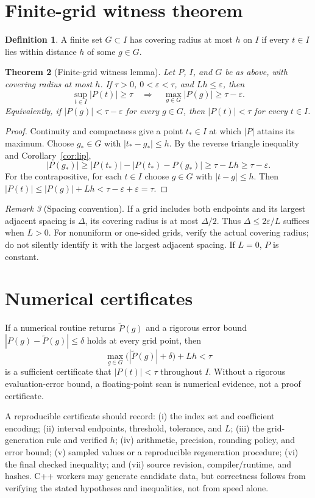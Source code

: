 \documentclass[11pt]{article}
\newtheorem{theorem}{Theorem}[section]
\theoremstyle{definition}\newtheorem{definition}[theorem]{Definition}
\theoremstyle{remark}\newtheorem{remark}[theorem]{Remark}
\begin{document}
\section{Finite-grid witness theorem}
\begin{definition}
A finite set $G\subset I$ has covering radius at most $h$ on $I$ if every $t\in I$ lies within distance $h$ of some $g\in G$.
\end{definition}
\begin{theorem}[Finite-grid witness lemma]\label{thm:grid}
Let $P$, $I$, and $G$ be as above, with covering radius at most $h$. If $\tau>0$, $0<\varepsilon<\tau$, and $Lh\le\varepsilon$, then
\[
\sup_{t\in I}|P(t)|\ge\tau
\quad\Longrightarrow\quad
\max_{g\in G}|P(g)|\ge\tau-\varepsilon.
\]
Equivalently, if $|P(g)|<\tau-\varepsilon$ for every $g\in G$, then $|P(t)|<\tau$ for every $t\in I$.
\end{theorem}
\begin{proof}
Continuity and compactness give a point $t_*\in I$ at which $|P|$ attains its maximum. Choose $g_*\in G$ with $|t_*-g_*|\le h$. By the reverse triangle inequality and Corollary~\ref{cor:lip},
\[
|P(g_*)|\ge |P(t_*)|-|P(t_*)-P(g_*)|
\ge\tau-Lh\ge\tau-\varepsilon.
\]
For the contrapositive, for each $t\in I$ choose $g\in G$ with $|t-g|\le h$. Then $|P(t)|\le |P(g)|+Lh<\tau-\varepsilon+\varepsilon=\tau$.
\end{proof}
\begin{remark}[Spacing convention]
If a grid includes both endpoints and its largest adjacent spacing is $\Delta$, its covering radius is at most $\Delta/2$. Thus $\Delta\le2\varepsilon/L$ suffices when $L>0$. For nonuniform or one-sided grids, verify the actual covering radius; do not silently identify it with the largest adjacent spacing. If $L=0$, $P$ is constant.
\end{remark}

\section{Numerical certificates}
If a numerical routine returns $\widetilde P(g)$ and a rigorous error bound $|P(g)-\widetilde P(g)|\le\delta$ holds at every grid point, then
\[
\max_{g\in G}\bigl(|\widetilde P(g)|+\delta\bigr)+Lh<\tau
\]
is a sufficient certificate that $|P(t)|<\tau$ throughout $I$. Without a rigorous evaluation-error bound, a floating-point scan is numerical evidence, not a proof certificate.

A reproducible certificate should record: (i) the index set and coefficient encoding; (ii) interval endpoints, threshold, tolerance, and $L$; (iii) the grid-generation rule and verified $h$; (iv) arithmetic, precision, rounding policy, and error bound; (v) sampled values or a reproducible regeneration procedure; (vi) the final checked inequality; and (vii) source revision, compiler/runtime, and hashes. C++ workers may generate candidate data, but correctness follows from verifying the stated hypotheses and inequalities, not from speed alone.
\end{document}
